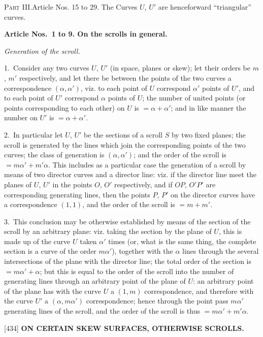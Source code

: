 \documentclass[12pt,a4paper]{article}
\newcommand{\paperref}[1]{\textup{[#1]}}
\theoremstyle{definition}
\begin{document}
\textsc{Part III.}\quad Article Nos. 15 to 29. The Curves $U$, $U'$ are henceforward ``triangular'' curves.

\smallskip
\textbf{Article Nos.~1 to 9. On the scrolls in general.}

\smallskip
\textit{Generation of the scroll.}

1.~Consider any two curves $U$, $U'$ (in space, planes or skew); let their orders be $m$, $m'$ respectively, and let there be between the points of the two curves a correspondence $(\alpha, \alpha')$, viz. to each point of $U$ correspond $\alpha'$ points of $U'$, and to each point of $U'$ correspond $\alpha$ points of $U$; the number of united points (or points corresponding to each other) on $U$ is $= \alpha + \alpha'$; and in like manner the number on $U'$ is $= \alpha + \alpha'$.

2.~In particular let $U$, $U'$ be the sections of a scroll $S$ by two fixed planes; the scroll is generated by the lines which join the corresponding points of the two curves; the class of generation is $(\alpha, \alpha')$; and the order of the scroll is $= m\alpha' + m'\alpha$. This includes as a particular case the generation of a scroll by means of two director curves and a director line: viz. if the director line meet the planes of $U$, $U'$ in the points $O$, $O'$ respectively, and if $OP$, $O'P'$ are corresponding generating lines, then the points $P$, $P'$ on the director curves have a correspondence $(1, 1)$, and the order of the scroll is $= m + m'$.

3.~This conclusion may be otherwise established by means of the section of the scroll by an arbitrary plane: viz. taking the section by the plane of $U$, this is made up of the curve $U$ taken $\alpha'$ times (or, what is the same thing, the complete section is a curve of the order $m\alpha'$), together with the $\alpha$ lines through the several intersections of the plane with the director line; the total order of the section is $= m\alpha' + \alpha$; but this is equal to the order of the scroll into the number of generating lines through an arbitrary point of the plane of $U$: an arbitrary point of the plane has with the curve $U$ a $(1, m)$ correspondence, and therefore with the curve $U'$ a $(\alpha, m\alpha')$ correspondence; hence through the point pass $m\alpha'$ generating lines of the scroll, and the order of the scroll is thus $= m\alpha' + m'\alpha$.

\newpage
\setcounter{page}{57}

\noindent\paperref{434}\quad
\textbf{ON CERTAIN SKEW SURFACES, OTHERWISE SCROLLS.}
\end{document}
